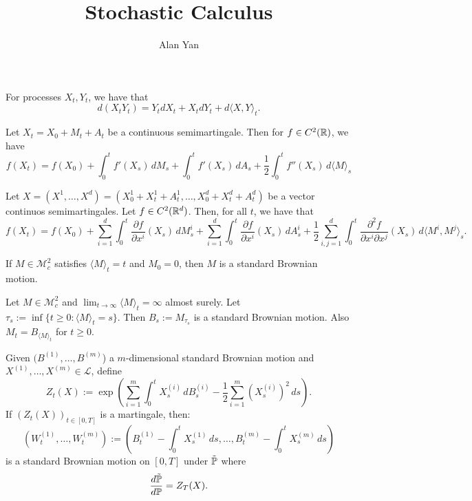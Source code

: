 \documentclass[12pt]{article}
\title{Stochastic Calculus}
\author{Alan Yan}
\begin{document}
\begin{thm}
	For processes $X_t, Y_t$, we have that 
	\[
		d(X_tY_t) = Y_t dX_t + X_t dY_t + d \langle X, Y \rangle_t.
	\]
\end{thm}

\begin{thm}
	Let $X_t = X_0 + M_t + A_t$ be a continuous semimartingale. Then for $f \in C^2(\mathbb{R})$, we have
	\[
		f(X_t) = f(X_0) + \int_0^t f'(X_s) \, dM_s + \int_0^t f'(X_s) \, dA_s + \frac{1}{2} \int_0^t f''(X_s) \, d \langle M \rangle_s	
	\]
\end{thm}

\begin{thm}
	Let $X = (X^1, \ldots, X^d) = (X_0^1 + X_t^1 + A_t^1, \ldots, X_0^d + X_t^d + A_t^d)$ be a vector continuos semimartingales. Let $f \in C^2(\mathbb{R}^d)$. Then, for all $t$, we have that 
	\[
		f(X_t) = f(X_0) + \sum_{i = 1}^d \int_0^t \frac{\partial f}{\partial x^i} (X_s) \, dM_s^i + \sum_{i = 1}^d \int_0^t \frac{\partial f}{\partial x^i} (X_s) \, dA_s^i + \frac{1}{2} \sum_{i, j = 1}^d \int_0^t \frac{\partial^2 f}{\partial x^i \partial x^j} (X_s) \, d \langle M^i, M^j \rangle_s.	
	\]
\end{thm}

\begin{thm}[Levy]
	If $M \in \mathscr{M}_c^2$ satisfies $\langle M \rangle_t = t$ and $M_0 = 0$, then $M$ is a standard Brownian motion. 
\end{thm}

\begin{thm}
	Let $M \in \mathscr{M}_c^2$ and $\lim_{t \to \infty} \langle M \rangle_t = \infty$ almost surely. Let $\tau_s := \inf \{t \geq 0 : \langle M \rangle_t = s \}$. Then $B_s := M_{\tau_s}$ is a standard Brownian motion. Also $M_t = B_{\langle M \rangle_t}$ for $t \geq 0$. 
\end{thm}

\begin{thm}
	Given $(B^{(1)}, \ldots, B^{(m)}$) a $m$-dimensional standard Brownian motion and $X^{(1)}, \ldots, X^{(m)} \in \mathscr{L}$, define 
	\[
		Z_t (X) := \exp \left ( \sum_{i = 1}^m \int_0^t X_s^{(i)} \, dB_s^{(i)} - \frac{1}{2} \sum_{i = 1}^m \left (X_s^{(i)} \right )^2 \, ds \right ).
	\]
	If $(Z_t(X))_{t \in [0, T]}$ is a martingale, then:
	\[
		(W_t^{(1)}, \ldots, W_t^{(m)}) := \left ( B_t^{(1)} - \int_0^t X_s^{(1)} \, ds , \ldots, B_t^{(m)} - \int_0^t X_s^{(m)} \, ds \right )	
	\]
	is a standard Brownian motion on $[0, T]$ under $\tilde{\mathbb{P}}$ where 
	\[
		\frac{d\tilde{\mathbb{P}}}{d\mathbb{P}} = Z_T(X). 	
	\]
\end{thm}
\end{document}
